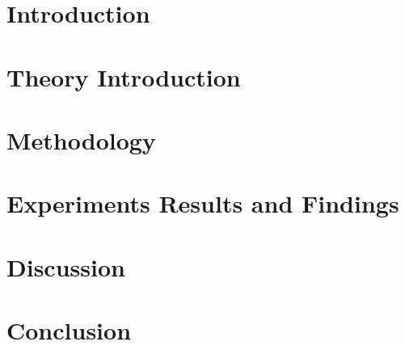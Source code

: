 \chapter{Introduction}\label{ch:introduction}


\chapter{Theory Introduction}\label{ch:first_chapter}


\chapter{Methodology}\label{ch:second_chapter}


\chapter{Experiments Results and Findings}\label{ch:experiments}


\chapter{Discussion}\label{ch:impl-bench}


\chapter{Conclusion}\label{ch:conclusion}

